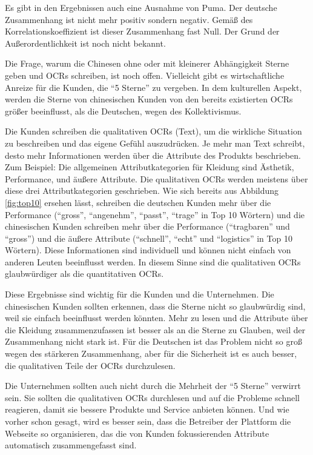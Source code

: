 Es gibt in den Ergebnissen auch eine Ausnahme von Puma. Der deutsche Zusammenhang ist nicht mehr positiv sondern negativ. Gemäß des Korrelationskoeffizient ist dieser Zusammenhang fast Null. Der Grund der Außerordentlichkeit ist noch nicht bekannt.

Die Frage, warum die Chinesen ohne oder mit kleinerer Abhängigkeit Sterne geben und \ac{OCRs} schreiben, ist noch offen. Vielleicht gibt es wirtschaftliche Anreize für die Kunden, die ``5 Sterne'' zu vergeben. In dem kulturellen Aspekt, werden die Sterne von chinesischen Kunden von den bereits existierten \ac{OCRs} größer beeinflusst, als die Deutschen, wegen des Kollektivismus. 

Die Kunden schreiben die qualitativen \ac{OCRs} (Text), um die wirkliche Situation zu beschreiben und das eigene Gefühl auszudrücken. Je mehr man Text schreibt, desto mehr Informationen werden über die Attribute des Produkts beschrieben. Zum Beispiel: Die allgemeinen Attributkategorien für Kleidung sind Ästhetik, Performance, und äußere Attribute. Die qualitativen \ac{OCRs} werden meistens über diese drei Attributkategorien geschrieben. Wie sich bereits aus Abbildung \ref{fig:top10} ersehen lässt, schreiben die deutschen Kunden mehr über die Performance (``gross'', ``angenehm'', ``passt'', ``trage'' in Top 10 Wörtern) und die chinesischen Kunden schreiben mehr über die Performance (``tragbaren'' und ``gross'') und die äußere Attribute (``schnell'', ``echt'' und ``logistics'' in Top 10 Wörtern). Diese Informationen sind individuell und können nicht einfach von anderen Leuten beeinflusst werden. In diesem Sinne sind die qualitativen \ac{OCRs} glaubwürdiger als die quantitativen \ac{OCRs}. 

Diese Ergebnisse sind wichtig für die Kunden und die Unternehmen. Die chinesischen Kunden sollten erkennen, dass die Sterne nicht so glaubwürdig sind, weil sie einfach beeinflusst werden könnten. Mehr zu lesen und die Attribute über die Kleidung zusammenzufassen ist besser als an die Sterne zu Glauben, weil der Zusammenhang nicht stark ist. Für die Deutschen ist das Problem nicht so groß wegen des stärkeren Zusammenhang, aber für die Sicherheit ist es auch besser, die qualitativen Teile der \ac{OCRs} durchzulesen.

Die Unternehmen sollten auch nicht durch die Mehrheit der ``5 Sterne'' verwirrt sein. Sie sollten die qualitativen \ac{OCRs} durchlesen und auf die Probleme schnell reagieren, damit sie bessere Produkte und Service anbieten können. Und wie vorher schon gesagt, wird es besser sein, dass die Betreiber der Plattform die Webseite so organisieren, das die von Kunden fokussierenden Attribute automatisch zusammengefasst sind.
